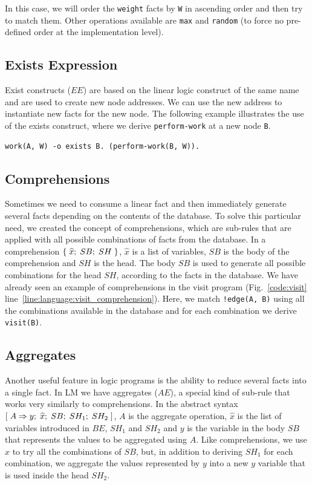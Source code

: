 In this case, we will order the \texttt{weight} facts by \texttt{W} in ascending
order and then try to match them. Other operations available are \texttt{max}
and \texttt{random} (to force no pre-defined order at the implementation level).

\subsection{Exists Expression}

Exist constructs ($EE$) are based on the linear logic construct of the same name
and are used to create new node addresses. We can use the new address to
instantiate new facts for the new node.  The following example illustrates the
use of the exists construct, where we derive \texttt{perform-work} at a new node
\texttt{B}.

\begin{Verbatim}[fontsize=\codesize]
   work(A, W) -o exists B. (perform-work(B, W)).
\end{Verbatim}

\subsection{Comprehensions}

Sometimes we need to consume a linear fact and then immediately generate several
facts depending on the contents of the database. To solve this particular need,
we created the concept of comprehensions, which are sub-rules that are applied
with all possible combinations of facts from the database. In a comprehension
$\{ \; \widehat{x}; \; SB; \; SH \; \}$, $\widehat{x}$ is a list of variables,
$SB$ is the body of the comprehension and $SH$ is the head.  The body $SB$ is
used to generate all possible combinations for the head $SH$, according to the
facts in the database.  We have already seen an example of comprehensions in the
visit program (Fig.~\ref{code:visit}
line~\ref{line:language:visit_comprehension}). Here, we match \texttt{!edge(A,
B)} using all the combinations available in the database and for each
combination we derive \texttt{visit(B)}.

\subsection{Aggregates}

Another useful feature in logic programs is the ability to reduce several facts
into a single fact.  In LM we have aggregates ($AE$), a special kind of sub-rule
that works very similarly to comprehensions.  In the abstract syntax
$[\; A \Rightarrow y; \; \widehat{x}; \; SB; \; SH_1; \; SH_2 \;]$, $A$ is the aggregate operation,
$\widehat{x}$ is the list of variables introduced in $BE$, $SH_1$ and $SH_2$
and $y$ is the variable in the body $SB$ that represents the values to be
aggregated using $A$. Like comprehensions, we use $\widehat{x}$ to try all
the combinations of $SB$, but, in addition to deriving $SH_1$ for each
combination, we aggregate the values represented by $y$ into a new $y$
variable that is used inside the head $SH_2$.


